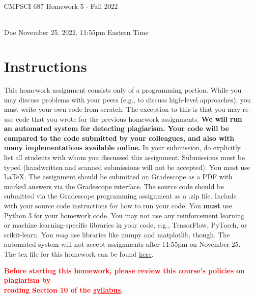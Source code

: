 \documentclass{article}
\newcommand{\WARNING}[1]{\textcolor{red}{\textbf{{#1}}}}
\begin{document}
\newpage
\begin{center}
    \begin{Large}
    CMPSCI 687 Homework 5 - Fall 2022
    \end{Large}
    \\
    Due November 25, 2022, 11:55pm Eastern Time
\end{center}



\section{Instructions}

This homework assignment consists only of a programming portion. While you may discuss problems with your peers (e.g., to discuss high-level approaches), you must write your own code from scratch. The exception to this is that you may re-use code that you wrote for the previous homework assignments. \textbf{We will run an automated system for detecting plagiarism. Your code will be compared to the code submitted by your colleagues, and also with many implementations available online.} In your submission, do explicitly list all students with whom you discussed this assignment. Submissions must be typed (handwritten and scanned submissions will not be accepted). You must use \LaTeX. The assignment should be submitted on Gradescope as a PDF with marked answers via the Gradescope interface. The source code should be submitted via the Gradescope programming assignment as a .zip file. Include with your source code instructions for how to run your code. You \textbf{must} use Python 3 for your homework code. You may not use any reinforcement learning or machine learning-specific libraries in your code, e.g., TensorFlow, PyTorch, or scikit-learn. You \textit{may} use libraries like numpy and matplotlib, though. The automated system will not accept assignments after 11:55pm on November 25. The tex file for this homework can be found \href{https://people.cs.umass.edu/~bsilva/courses/CMPSCI_687/Fall2022/HWs/HW5_Source.zip}{here}.


\begin{center}
    \WARNING{Before starting this homework, please review this course's policies on plagiarism by  \\reading Section 10 of the \href{https://people.cs.umass.edu/~bsilva/courses/CMPSCI_687/Fall2022/F22_687_Syllabus_v2.pdf}{\textcolor{red}{\underline{syllabus}}}.}
\end{center}
\end{document}
